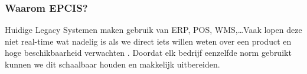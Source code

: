 \subsubsection{Waarom EPCIS?}
Huidige Legacy Systemen maken gebruik van ERP, POS, WMS,\dots Vaak lopen deze niet real-time wat nadelig is als we direct iets willen weten over een product en hoge beschikbaarheid verwachten \autocite{Vieweger}.
Doordat elk bedrijf eenzelfde norm gebruikt kunnen we dit schaalbaar houden en makkelijk uitbereiden.










